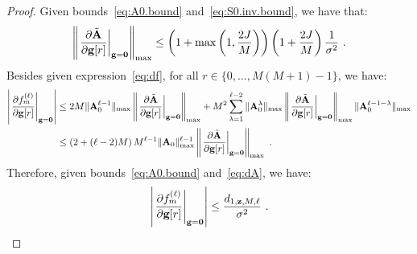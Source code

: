 \documentclass[journal,onecolumn]{IEEEtran}
\begin{document}
\begin{proof}
Given bounds~\eqref{eq:A0.bound} and~\eqref{eq:S0.inv.bound}, we have that:
\begin{equation}
\left\| \left.\dfrac{\partial \tilde\bA}{\partial \bg[r]}\right|_{\bg=\bzero}\right\|_{\max} \leq \left(1+\max\left(1,\frac{2J}{M}\right)\right)\left(1+\frac{2J}{M}\right)\dfrac{1}{\sigma^2}\ .
\label{eq:dA}
\end{equation}
Besides given expression~\eqref{eq:df}, for all $r\in\{0,\ldots,M(M+1)-1\}$, we have:
\begin{align*}
\left|\left.\dfrac{\partial f_m^{(\ell)}}{\partial {\mathbf g}[r]}\right\vert_{{\mathbf g}=\boldsymbol{0}}\right| &\leq 2M\|{\mathbf A}_0^{\ell-1}\|_{\max} \left\| \left.\dfrac{\partial \tilde{{\mathbf A}}}{\partial {\mathbf g}[r]}\right|_{{\mathbf g}=\boldsymbol{0}}\right\|_{\max} + M^2\sum_{\lambda=1}^{\ell-2} \|{\mathbf A}_0^\lambda\|_{\max} \left\| \left.\dfrac{\partial \tilde{{\mathbf A}}}{\partial {\mathbf g}[r]}\right|_{{\mathbf g}=\boldsymbol{0}}\right\|_{\max}  \|{\mathbf A}_0^{\ell-1-\lambda}\|_{\max} \\
&\leq \left(2 + (\ell-2)M\right)M^{\ell-1} \|{\mathbf A}_0\|_{\max}^{\ell-1}\left\|\left.\dfrac{\partial\tilde{{\mathbf A}}}{\partial {\mathbf g}[r]}\right|_{{\mathbf g}=\boldsymbol{0}}\right\|_{\max}\ .
\end{align*}
Therefore, given bounds~\eqref{eq:A0.bound} and~\eqref{eq:dA}, we have:
\begin{equation*}
\left|\left.\dfrac{\partial f_m^{(\ell)}}{\partial {\mathbf g}[r]}\right\vert_{{\mathbf g}=\boldsymbol{0}}\right| \leq \dfrac{d_{1,{\mathbf z},M,\ell}}{\sigma^2}\ .
\end{equation*} 


\end{proof}
\end{document}
